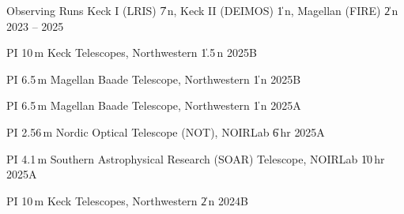 \begin{cventries}


\cvsimpentry
    {Observing Runs}
    {Keck I (LRIS) \| 7\,n, Keck II (DEIMOS) \| 1\,n, Magellan (FIRE) \| 2\,n}
    {2023 -- 2025}
    {}

\cvsimpentry
    {PI}
    {10\,m Keck Telescopes, Northwestern \| 1.5\,n}
    {2025B}
    {}

\cvsimpentry
    {PI}
    {6.5\,m Magellan Baade Telescope, Northwestern \| 1\,n}
    {2025B}
    {}

\cvsimpentry
    {PI}
    {6.5\,m Magellan Baade Telescope, Northwestern \| 1\,n}
    {2025A}
    {}

\cvsimpentry
    {PI}
    {2.56\,m Nordic Optical Telescope (NOT), NOIRLab \| 6\,hr}
    {2025A}
    {}

\cvsimpentry
    {PI}
    {4.1\,m Southern Astrophysical Research (SOAR) Telescope, NOIRLab \| 10\,hr}
    {2025A}
    {}
    
\cvsimpentry
    {PI}
    {10\,m Keck Telescopes, Northwestern \| 2\,n}
    {2024B}
    {}







\end{cventries}